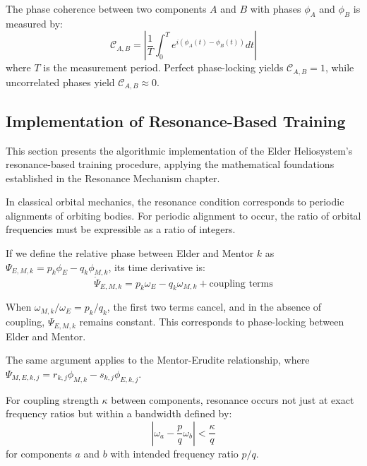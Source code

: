 \begin{definition}
The phase coherence between two components $A$ and $B$ with phases $\phi_A$ and $\phi_B$ is measured by:
\begin{equation}
\mathcal{C}_{A,B} = \left| \frac{1}{T} \int_0^T e^{i(\phi_A(t) - \phi_B(t))} dt \right|
\end{equation}
where $T$ is the measurement period. Perfect phase-locking yields $\mathcal{C}_{A,B} = 1$, while uncorrelated phases yield $\mathcal{C}_{A,B} \approx 0$.
\end{definition}

\subsection{Implementation of Resonance-Based Training}

This section presents the algorithmic implementation of the Elder Heliosystem's resonance-based training procedure, applying the mathematical foundations established in the Resonance Mechanism chapter.

In classical orbital mechanics, the resonance condition corresponds to periodic alignments of orbiting bodies. For periodic alignment to occur, the ratio of orbital frequencies must be expressible as a ratio of integers.

If we define the relative phase between Elder and Mentor $k$ as $\Psi_{E,M,k} = p_k\phi_E - q_k\phi_{M,k}$, its time derivative is:
\begin{equation}
\dot{\Psi}_{E,M,k} = p_k\omega_E - q_k\omega_{M,k} + \text{coupling terms}
\end{equation}

When $\omega_{M,k}/\omega_E = p_k/q_k$, the first two terms cancel, and in the absence of coupling, $\Psi_{E,M,k}$ remains constant. This corresponds to phase-locking between Elder and Mentor.

The same argument applies to the Mentor-Erudite relationship, where $\Psi_{M,E,k,j} = r_{k,j}\phi_{M,k} - s_{k,j}\phi_{E,k,j}$.

\begin{theorem}
For coupling strength $\kappa$ between components, resonance occurs not just at exact frequency ratios but within a bandwidth defined by:
\begin{equation}
\left|\omega_a - \frac{p}{q}\omega_b\right| < \frac{\kappa}{q}
\end{equation}
for components $a$ and $b$ with intended frequency ratio $p/q$.
\end{theorem}

